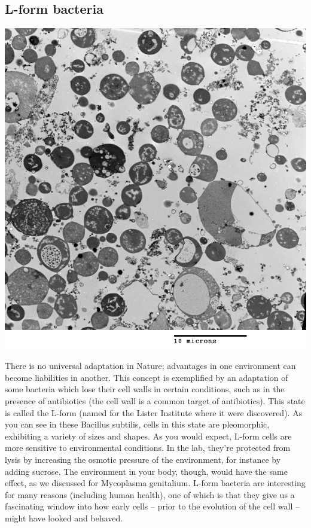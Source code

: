 \documentclass[]{tufte-book}
\begin{document}
\subsection{L-form bacteria}\label{L-form_bacteria}

\includegraphics{img/02_schematic/2_2_1_L_form_bacteria}

There is no universal adaptation in Nature; advantages in one
environment can become liabilities in another. This concept is
exemplified by an adaptation of some bacteria which lose their cell
walls in certain conditions, such as in the presence of antibiotics (the
cell wall is a common target of antibiotics). This state is called the
L-form (named for the Lister Institute where it were discovered). As you
can see in these Bacillus subtilis, cells in this state are pleomorphic,
exhibiting a variety of sizes and shapes. As you would expect, L-form
cells are more sensitive to environmental conditions. In the lab,
they're protected from lysis by increasing the osmotic pressure of the
environment, for instance by adding sucrose. The environment in your
body, though, would have the same effect, as we discussed for Mycoplasma
genitalium. L-form bacteria are interesting for many reasons (including
human health), one of which is that they give us a fascinating window
into how early cells -- prior to the evolution of the cell wall -- might
have looked and behaved.
\end{document}
